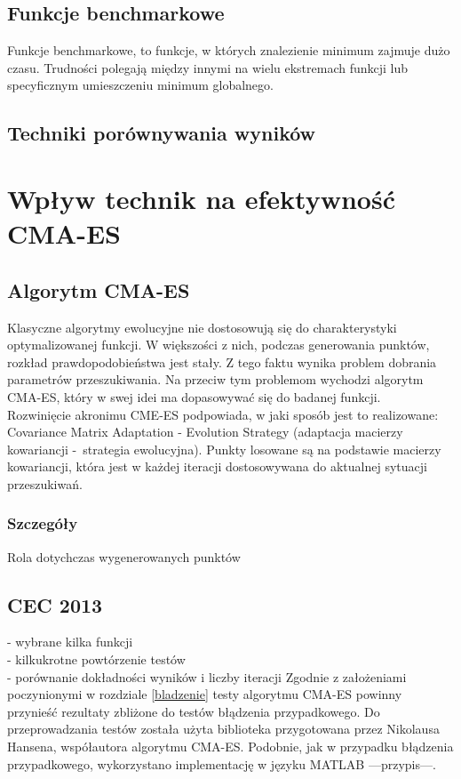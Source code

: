\documentclass{mini}
\begin{document}
\subsection{Funkcje benchmarkowe}
Funkcje benchmarkowe, to funkcje, w których znalezienie minimum zajmuje dużo czasu. Trudności polegają między innymi na wielu ekstremach funkcji lub specyficznym umieszczeniu minimum globalnego.

\subsection{Techniki porównywania wyników}

\pagebreak

\section{Wpływ technik na efektywność CMA-ES}

\subsection{Algorytm CMA-ES}
Klasyczne algorytmy ewolucyjne nie dostosowują się do charakterystyki optymalizowanej funkcji. W większości z nich, podczas generowania punktów, rozkład prawdopodobieństwa jest stały. Z tego faktu wynika problem dobrania parametrów przeszukiwania. Na przeciw tym problemom wychodzi algorytm CMA-ES, który w swej idei ma dopasowywać się do badanej funkcji.\\
Rozwinięcie akronimu CME-ES podpowiada, w jaki sposób jest to realizowane: Covariance Matrix Adaptation - Evolution Strategy (adaptacja macierzy kowariancji -~strategia ewolucyjna). Punkty losowane są na podstawie macierzy kowariancji, która jest w każdej iteracji dostosowywana do aktualnej sytuacji przeszukiwań.

\subsubsection*{Szczegóły}
Rola dotychczas wygenerowanych punktów

\subsection{CEC 2013}
- wybrane kilka funkcji\\
- kilkukrotne powtórzenie testów\\
- porównanie dokładności wyników i liczby iteracji
Zgodnie z założeniami poczynionymi w rozdziale \ref{bladzenie} testy algorytmu CMA-ES powinny przynieść rezultaty zbliżone do testów błądzenia przypadkowego. Do przeprowadzania testów została użyta biblioteka przygotowana przez Nikolausa Hansena, współautora algorytmu CMA-ES. Podobnie, jak w przypadku błądzenia przypadkowego, wykorzystano implementację w języku MATLAB ---przypis---.
\end{document}
